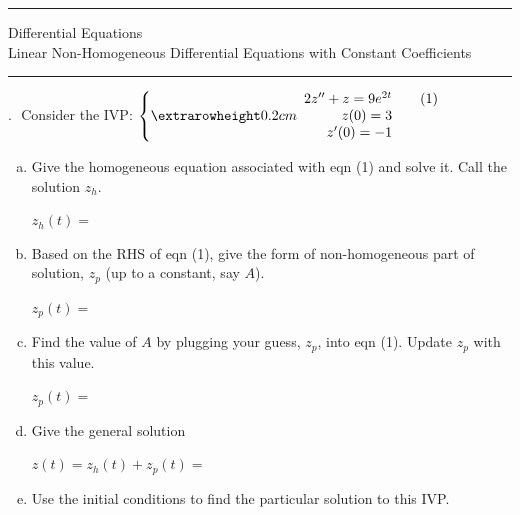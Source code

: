 \documentclass[12pt]{amsart}
\newcommand{\BACKROOT}{../../../..}
\newcommand{\TEACHINGROOT}{\BACKROOT}
\newcommand{\PATHTOHEADERS}{\TEACHINGROOT/Headers}
\numberwithin{equation}{section}
\newcounter{ProbNum}
\def\NEWPROB{\stepcounter{ProbNum} {\noindent \arabic{ProbNum}. \,\,}}
\begin{document}


\pagestyle{empty}

\noindent\rule{7.6in}{0.4pt}

{\centering\sc 
\noindent Differential Equations\\
 Linear Non-Homogeneous Differential Equations with Constant Coefficients\\
}
\noindent\rule{7.6in}{0.4pt}

\vspace{0.1cm}

\NEWPROB Consider the IVP: \hspace{1.0cm}
$\left\{
\setlength{\extrarowheight}{0.2cm}
\begin{array}{rl}
	2z'' + z = 9e^{2t} & \quad (1)\\
	z(0) = 3 & \\
	z'(0) = -1 & \\
\end{array}
\right.$
\begin{enumerate}[(a)]
	\item  Give the homogeneous equation associated with eqn (1) and solve it. Call the solution $z_h$.
	\vspace{3.6cm}
	
	$z_h(t)=$
	
	\vspace{0.2cm}
	\item  Based on the RHS of eqn (1), give the form of non-homogeneous part of solution, $z_p$ (up to a constant, say $A$).
	
	$z_p(t)=$
	
	\vspace{0.2cm}
	\item  Find the value of $A$ by plugging your guess, $z_p$, into eqn (1). Update $z_p$ with this value.
	\vspace{5.0cm}
	
	$z_p(t)=$
	
	\vspace{0.2cm}
	\item  Give the general solution 
	
	$z(t) = z_h(t) + z_p(t) = $
	
	\vspace{0.2cm}
	
	\item  Use the initial conditions to find the particular solution to this IVP.\\
\end{enumerate}
\end{document}
